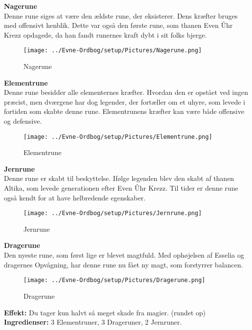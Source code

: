 \textbf{Nagerune}\\
Denne rune siges at være den ældste rune, der eksisterer. Dens kræfter bruges med offensivt henblik. Dette var også den første rune, som thanen Even Ûhr Krezz opdagede, da han fandt runernes kraft dybt i sit folks bjerge.\\
\begin{figure}[H]
    \centering
    \texttt{[image: ../Evne-Ordbog/setup/Pictures/Nagerune.png]}
    \caption{Nagerune}
\end{figure}

\textbf{Elementrune}\\
Denne rune besidder alle elementernes kræfter. Hvordan den er opstået ved ingen præcist, men dværgene har dog legender, der fortæller om et uhyre, som levede i fortiden som skabte denne rune. Elementrunens kræfter kan være både offensive og defensive.\\
\begin{figure}[H]
    \centering
    \texttt{[image: ../Evne-Ordbog/setup/Pictures/Elementrune.png]}
    \caption{Elementrune}
\end{figure}

\textbf{Jernrune}\\
Denne rune er skabt til beskyttelse. Ifølge legenden blev den skabt af thanen Altika, som levede generationen efter Even Ûhr Krezz. Til tider er denne rune også kendt for at have
helbredende egenskaber.
\begin{figure}[H]
    \centering
    \texttt{[image: ../Evne-Ordbog/setup/Pictures/Jernrune.png]}
    \caption{Jernrune}
\end{figure}

\textbf{Dragerune}\\
Den nyeste rune, som først lige er blevet magtfuld. Med ophøjelsen af Esselia og dragernes Opvågning, har denne rune nu fået ny magt, som forstyrrer balancen.\\
\begin{figure}[H]
    \centering
    \texttt{[image: ../Evne-Ordbog/setup/Pictures/Dragerune.png]}
    \caption{Dragerune}
\end{figure}

\begin{runeskjold*}[Drageskind]
\textbf{Effekt:} Du tager kun halvt så meget skade fra magier. (rundet op)\\
\textbf{Ingredienser:} 3 Elementruner, 3 Drageruner, 2 Jernruner.
\end{runeskjold*}

